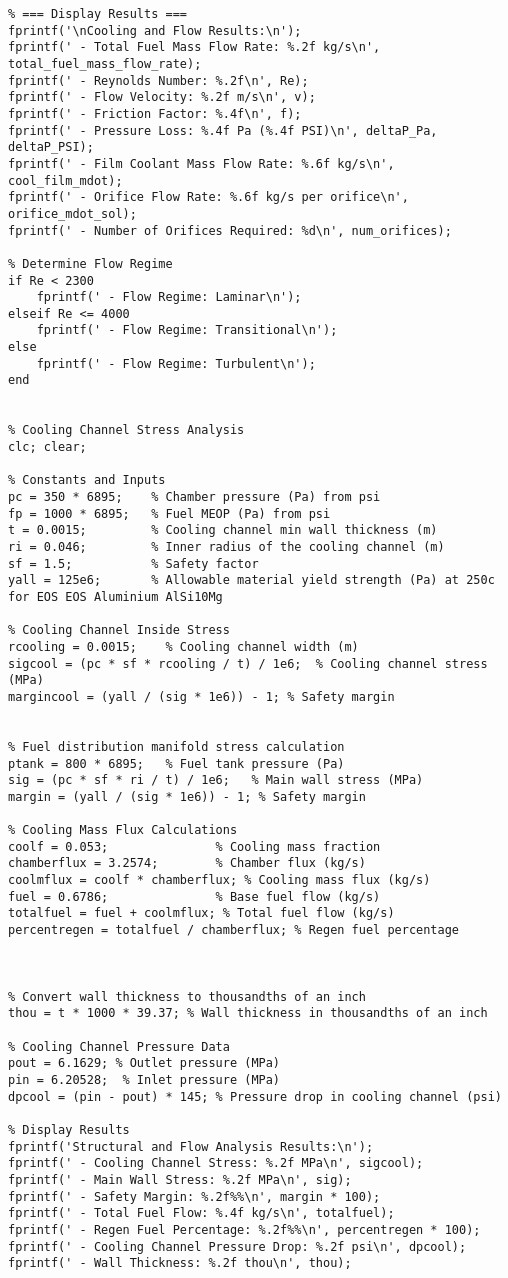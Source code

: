 \begin{verbatim}
% === Display Results ===
fprintf('\nCooling and Flow Results:\n');
fprintf(' - Total Fuel Mass Flow Rate: %.2f kg/s\n', total_fuel_mass_flow_rate);
fprintf(' - Reynolds Number: %.2f\n', Re);
fprintf(' - Flow Velocity: %.2f m/s\n', v);
fprintf(' - Friction Factor: %.4f\n', f);
fprintf(' - Pressure Loss: %.4f Pa (%.4f PSI)\n', deltaP_Pa, deltaP_PSI);
fprintf(' - Film Coolant Mass Flow Rate: %.6f kg/s\n', cool_film_mdot);
fprintf(' - Orifice Flow Rate: %.6f kg/s per orifice\n', orifice_mdot_sol);
fprintf(' - Number of Orifices Required: %d\n', num_orifices);

% Determine Flow Regime
if Re < 2300
    fprintf(' - Flow Regime: Laminar\n');
elseif Re <= 4000
    fprintf(' - Flow Regime: Transitional\n');
else
    fprintf(' - Flow Regime: Turbulent\n');
end


% Cooling Channel Stress Analysis 
clc; clear;

% Constants and Inputs
pc = 350 * 6895;    % Chamber pressure (Pa) from psi
fp = 1000 * 6895;   % Fuel MEOP (Pa) from psi
t = 0.0015;         % Cooling channel min wall thickness (m)
ri = 0.046;         % Inner radius of the cooling channel (m)
sf = 1.5;           % Safety factor
yall = 125e6;       % Allowable material yield strength (Pa) at 250c for EOS EOS Aluminium AlSi10Mg 

% Cooling Channel Inside Stress
rcooling = 0.0015;    % Cooling channel width (m)
sigcool = (pc * sf * rcooling / t) / 1e6;  % Cooling channel stress (MPa)
margincool = (yall / (sig * 1e6)) - 1; % Safety margin


% Fuel distribution manifold stress calculation
ptank = 800 * 6895;   % Fuel tank pressure (Pa)
sig = (pc * sf * ri / t) / 1e6;   % Main wall stress (MPa)
margin = (yall / (sig * 1e6)) - 1; % Safety margin

% Cooling Mass Flux Calculations
coolf = 0.053;               % Cooling mass fraction
chamberflux = 3.2574;        % Chamber flux (kg/s)
coolmflux = coolf * chamberflux; % Cooling mass flux (kg/s)
fuel = 0.6786;               % Base fuel flow (kg/s)
totalfuel = fuel + coolmflux; % Total fuel flow (kg/s)
percentregen = totalfuel / chamberflux; % Regen fuel percentage



% Convert wall thickness to thousandths of an inch
thou = t * 1000 * 39.37; % Wall thickness in thousandths of an inch

% Cooling Channel Pressure Data
pout = 6.1629; % Outlet pressure (MPa)
pin = 6.20528;  % Inlet pressure (MPa)
dpcool = (pin - pout) * 145; % Pressure drop in cooling channel (psi)

% Display Results
fprintf('Structural and Flow Analysis Results:\n');
fprintf(' - Cooling Channel Stress: %.2f MPa\n', sigcool);
fprintf(' - Main Wall Stress: %.2f MPa\n', sig);
fprintf(' - Safety Margin: %.2f%%\n', margin * 100);
fprintf(' - Total Fuel Flow: %.4f kg/s\n', totalfuel);
fprintf(' - Regen Fuel Percentage: %.2f%%\n', percentregen * 100);
fprintf(' - Cooling Channel Pressure Drop: %.2f psi\n', dpcool);
fprintf(' - Wall Thickness: %.2f thou\n', thou);
\end{verbatim}